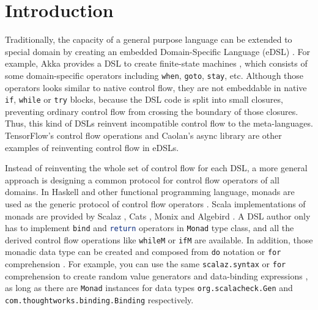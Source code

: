 \section{Introduction}\label{Introduction}

Traditionally, the capacity of a general purpose language can be extended to special domain by creating an embedded Domain-Specific Language (eDSL) \cite{fowler2010domain} . For example, Akka provides a DSL to create finite-state machines \cite{lightbend2017akka}, which consists of some domain-specific operators including \lstinline{when}, \lstinline{goto}, \lstinline{stay}, etc. Although those operators looks similar to native control flow, they are not embeddable in native \lstinline{if}, \lstinline{while} or \lstinline{try} blocks, because the DSL code is split into small closures, preventing ordinary control flow from crossing the boundary of those closures. Thus, this kind of DSLs reinvent incompatible control flow to the meta-languages. TensorFlow's control flow operations \cite{abadi2016tensorflow} and Caolan's async library \cite{caolan2017async} are other examples of reinventing control flow in eDSLs.

Instead of reinventing the whole set of control flow for each DSL, a more general approach is designing a common protocol for control flow operators of all domains. In Haskell and other functional programming language, monads are used as the generic protocol of control flow operators \cite{wadler1990comprehending,wadler1992essence,jones1993composing}. Scala implementations of monads are provided by Scalaz \cite{kenji2017scalaz}, Cats \cite{typelevel2017cats}, Monix \cite{nedelcu2017monix} and Algebird \cite{twitter2016algebird}. A DSL author only has to implement \lstinline{bind} and \lstinline[language=Haskell,deletekeywords={return}]{return} operators in \lstinline{Monad} type class, and all the derived control flow operations like \lstinline{whileM} or \lstinline{ifM} are available. In addition, those monadic data type can be created and composed from \lstinline{do} notation \cite{jones1998haskell} or \lstinline{for} comprehension \cite{odersky2004scala}. For example, you can use the same \lstinline{scalaz.syntax} or \lstinline{for} comprehension to create random value generators \cite{nilsson2015scalacheck} and data-binding expressions \cite{yangbo2016binding}, as long as there are \lstinline{Monad} instances for data types \lstinline{org.scalacheck.Gen} and \lstinline{com.thoughtworks.binding.Binding} respectively.

